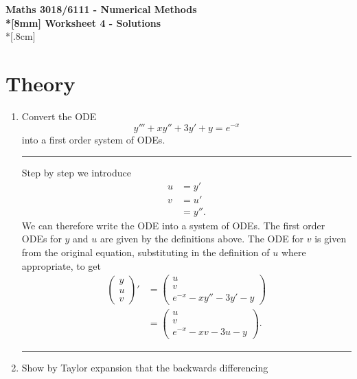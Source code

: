 \documentclass[10pt]{article}
\begin{document}
\thispagestyle{empty}
\begin{center}
\textbf{\Large Maths 3018/6111 - Numerical Methods \\*[8mm]
Worksheet 4 - Solutions}\\*[.8cm]
\end{center}

\section*{Theory}

\begin{enumerate}
\item Convert the ODE
  \begin{equation*}
    y''' + x y'' + 3 y' + y = e^{-x}
  \end{equation*}
  into a first order system of ODEs.
  \begin{center}
    \rule{0.9\textwidth}{.1pt}
  \end{center}
  Step by step we introduce
  \begin{align*}
    u & = y' \\
    v & = u' \\
      & = y''.
  \end{align*}
  We can therefore write the ODE into a system of ODEs. The first
  order ODEs for $y$ and $u$ are given by the definitions above. The
  ODE for $v$ is given from the original equation, substituting in the
  definition of $u$ where appropriate, to get
  \begin{align*}
    \begin{pmatrix}
      y \\ u \\ v
    \end{pmatrix}' & =
    \begin{pmatrix}
      u \\ v \\ e^{-x} - x y'' - 3 y' - y
    \end{pmatrix} \\
    & =
    \begin{pmatrix}
      u \\ v \\ e^{-x} - x v - 3 u - y
    \end{pmatrix}.
  \end{align*}
  \begin{center}
    \rule{0.9\textwidth}{.1pt}
  \end{center}
\item Show by Taylor expansion that the backwards differencing

\end{enumerate}
\end{document}
